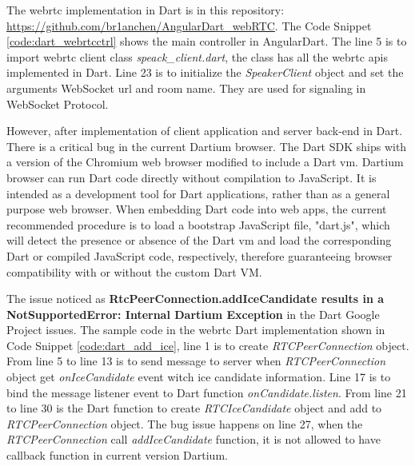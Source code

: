 \par The \gls{webrtc} implementation in Dart is in this repository: \url{https://github.com/br1anchen/AngularDart_webRTC}. The Code Snippet \ref{code:dart_webrtcctrl} shows the main controller in AngularDart. The line 5 is to import \gls{webrtc} client class \textit{speack\_client.dart}, the class has all the \gls{webrtc} \gls{api}s implemented in Dart. Line 23 is to initialize the \textit{SpeakerClient} object and set the arguments WebSocket url and room name. They are used for signaling in WebSocket Protocol.

\par However, after implementation of client application and server back-end in Dart. There is a critical bug in the current Dartium browser. The Dart SDK ships with a version of the Chromium web browser modified to include a Dart \gls{vm}. Dartium browser can run Dart code directly without compilation to JavaScript. It is intended as a development tool for Dart applications, rather than as a general purpose web browser. When embedding Dart code into web apps, the current recommended procedure is to load a bootstrap JavaScript file, "dart.js", which will detect the presence or absence of the Dart \gls{vm} and load the corresponding Dart or compiled JavaScript code, respectively, therefore guaranteeing browser compatibility with or without the custom Dart VM.\cite{wiki:dart} 
\par The issue noticed as \textbf{RtcPeerConnection.addIceCandidate results in a NotSupportedError: Internal Dartium Exception} in the Dart Google Project issues.\cite{bug:dartium} The sample code in the \gls{webrtc} Dart implementation shown in Code Snippet \ref{code:dart_add_ice}, line 1 is to create \textit{RTCPeerConnection} object. From line 5 to line 13 is to send message to server when \textit{RTCPeerConnection} object get \textit{onIceCandidate} event witch \gls{ice} candidate information. Line 17 is to bind the message listener event to Dart function \textit{onCandidate.listen}. From line 21 to line 30 is the Dart function to create \textit{RTCIceCandidate} object and add to \textit{RTCPeerConnection} object. The bug issue happens on line 27, when the \textit{RTCPeerConnection} call \textit{addIceCandidate} function, it is not allowed to have callback function in current version Dartium.

